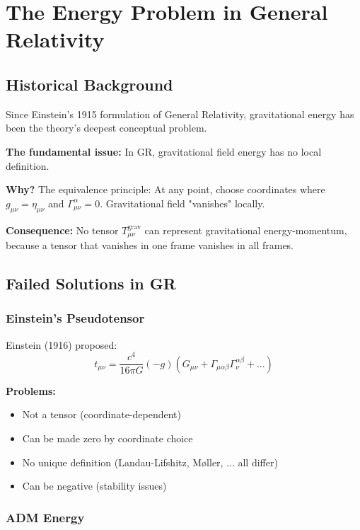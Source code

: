 \documentclass[11pt,a4paper]{article}
\theoremstyle{definition}
\theoremstyle{remark}
\begin{document}
	\section{The Energy Problem in General Relativity}
	
	\subsection{Historical Background}
	
	Since Einstein's 1915 formulation of General Relativity, gravitational energy has been the theory's deepest conceptual problem.
	
	\textbf{The fundamental issue:} In GR, gravitational field energy has no local definition.
	
	\textbf{Why?} The equivalence principle: At any point, choose coordinates where $g_{\mu\nu} = \eta_{\mu\nu}$ and $\Gamma^\alpha_{\mu\nu} = 0$. Gravitational field "vanishes" locally.
	
	\textbf{Consequence:} No tensor $T_{\mu\nu}^{\text{grav}}$ can represent gravitational energy-momentum, because a tensor that vanishes in one frame vanishes in all frames.
	
	\subsection{Failed Solutions in GR}
	
	\subsubsection{Einstein's Pseudotensor}
	
	Einstein (1916) proposed:
	\begin{equation}
		t_{\mu\nu} = \frac{c^4}{16\pi G}(-g)(G_{\mu\nu} + \Gamma_{\mu\alpha\beta}\Gamma_{\nu}^{\alpha\beta} + ...)
	\end{equation}
	
	\textbf{Problems:}
	\begin{itemize}
		\item Not a tensor (coordinate-dependent)
		\item Can be made zero by coordinate choice
		\item No unique definition (Landau-Lifshitz, Møller, ... all differ)
		\item Can be negative (stability issues)
	\end{itemize}
	
	\subsubsection{ADM Energy}
	
\end{document}
